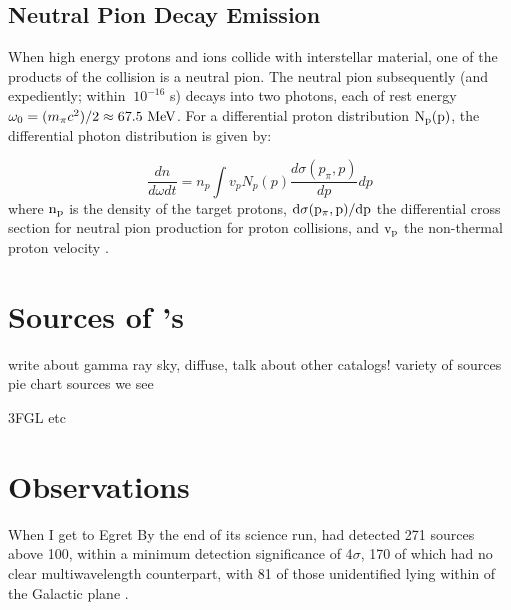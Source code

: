 

\subsection{Neutral Pion Decay Emission}\label{gamAstr:PP}
When high energy protons and ions collide with interstellar material, one of the products of the collision is a neutral pion. The neutral pion subsequently (and expediently; within $~10^{-16}$ s) decays into two \gam{} photons, each of rest energy $\omega_0 =(m_{\pi}c^2)/2\approx 67.5~\mathrm{MeV}{}$. For a differential proton distribution ${\rm N_p(p)}$, the differential photon distribution is given by:

\begin{equation}
\frac{d n}{d \omega d t} = 
n_p \int v_p N_p(p) 
\frac{d \sigma(p_\pi, p)}{d p}dp
\end{equation}
where ${\rm n_p}$ is the density of the target protons, ${\rm d \sigma(p_\pi, p)/dp}$ the differential cross section for neutral pion production for proton collisions, and ${\rm v_p}$ the non-thermal proton velocity \citep{Hillier84,Dermer86,Aharonian00}.

\section{Sources of \gam's}\label{gamAstr:Sources}
write about gamma ray sky, diffuse, talk about other catalogs! variety of sources pie chart sources we see

3FGL etc



\section{\gam{} Observations}\label{gamAstr:obs}

When I get to Egret
By the end of its science run, \egret{} had detected 271 sources above 100\mev{}, within a minimum detection significance of 4$\sigma$, 170 of which had no clear multiwavelength counterpart, with 81 of those unidentified lying within \blat of the Galactic plane \citep{Hartman99}.

